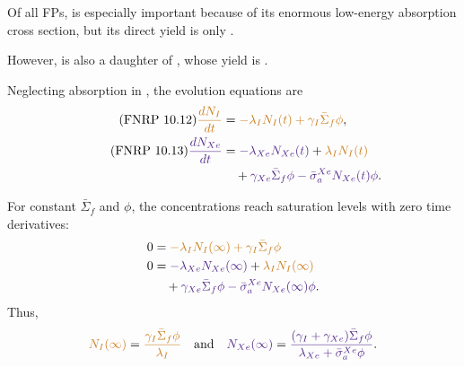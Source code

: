 \documentclass{ne630handout}
\begin{document}
Of all FPs,  is especially important because of
its enormous low-energy absorption cross section, but its direct yield
is only .

\vspace{5pt}

However,  is also a daughter of
, whose yield is .


\begin{center}
 
\end{center}

\vspace{5pt}

Neglecting absorption in , the evolution equations
are
\begin{align*}
 \tag{FNRP 10.12}
 \Alert{\frac{dN_I}{dt}}
  &=\Alert{-\lambda_I N_I(t)+\gamma_I\bar\Sigma_f\phi},\\
 \tag{FNRP 10.13}
 \Primary{\frac{dN_{Xe}}{dt}}
  &=\Primary{-\lambda_{Xe}N_{Xe}(t)}+\Alert{\lambda_I N_I(t)}\\
  &\quad+\Primary{\gamma_{Xe}\bar\Sigma_f\phi
                   -\bar\sigma_a^{Xe}N_{Xe}(t)\phi}.
\end{align*}

\colend

\newpage

\colstart 

For constant $\bar\Sigma_f$ and $\phi$, the concentrations reach
saturation levels with zero time derivatives:
\begin{align*}
 0&=\Alert{-\lambda_I N_I(\infty)+\gamma_I\bar\Sigma_f\phi} \\
 0&=\Primary{-\lambda_{Xe}N_{Xe}(\infty)}+\Alert{\lambda_I N_I(\infty)}\\
  &\quad+\Primary{\gamma_{Xe}\bar\Sigma_f\phi
                    -\bar\sigma_a^{Xe}N_{Xe}(\infty)\phi}.
\end{align*}
Thus,
\begin{align*}
 \Alert{N_I(\infty)}=\Alert{\frac{\gamma_I\bar\Sigma_f\phi}{\lambda_I}}
 \quad \text{and} \quad
 \Primary{N_{Xe}(\infty)}=\Primary{
   \frac{(\gamma_I+\gamma_{Xe})\bar\Sigma_f\phi}
        {\lambda_{Xe}+\bar\sigma_a^{Xe}\phi}}.
\end{align*}
\end{document}
